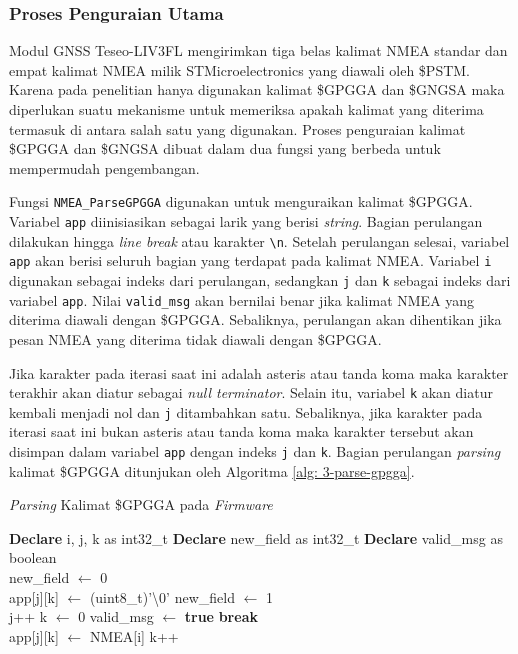 \subsubsection{Proses Penguraian Utama}
Modul GNSS Teseo\hyp{}LIV3FL mengirimkan tiga belas kalimat NMEA standar dan empat kalimat NMEA milik STMicroelectronics yang diawali oleh \$PSTM. Karena pada penelitian hanya digunakan kalimat \$GPGGA dan \$GNGSA maka diperlukan suatu mekanisme untuk memeriksa apakah kalimat yang diterima termasuk di antara salah satu yang digunakan. Proses penguraian kalimat \$GPGGA dan \$GNGSA dibuat dalam dua fungsi yang berbeda untuk mempermudah pengembangan. 

Fungsi \texttt{NMEA\_ParseGPGGA} digunakan untuk menguraikan kalimat \$GPGGA. Variabel \texttt{app} diinisiasikan sebagai larik yang berisi \textit{string}. Bagian perulangan dilakukan hingga \textit{line break} atau karakter \texttt{\textbackslash n}. Setelah perulangan selesai, variabel \texttt{app} akan berisi seluruh bagian yang terdapat pada kalimat NMEA. Variabel \texttt{i} digunakan sebagai indeks dari perulangan, sedangkan \texttt{j} dan \texttt{k} sebagai indeks dari variabel \texttt{app}. Nilai \texttt{valid\_msg} akan bernilai benar jika kalimat NMEA yang diterima diawali dengan \$GPGGA. Sebaliknya, perulangan akan dihentikan jika pesan NMEA yang diterima tidak diawali dengan \$GPGGA.

Jika karakter pada iterasi saat ini adalah asteris atau tanda koma maka karakter terakhir akan diatur sebagai \textit{null terminator}. Selain itu, variabel \texttt{k} akan diatur kembali menjadi nol dan \texttt{j} ditambahkan satu. Sebaliknya, jika karakter pada iterasi saat ini bukan asteris atau tanda koma maka karakter tersebut akan disimpan dalam variabel \texttt{app} dengan indeks \texttt{j} dan \texttt{k}. Bagian perulangan \textit{parsing} kalimat \$GPGGA ditunjukan oleh Algoritma \ref{alg: 3-parse-gpgga}.

\begin{algorithm}[H]
	\caption{\textit{Parsing} Kalimat \$GPGGA pada \textit{Firmware}}
	\label{alg: 3-parse-gpgga}
	\begin{algorithmic}[1]
	\State \textbf{Declare} i, j, k as int32\_t
	\State \textbf{Declare} new\_field as int32\_t
	\State \textbf{Declare} valid\_msg as boolean
	\\
		\State new\_field $\gets$ 0
		\\
			\State app[j][k] $\gets$ (uint8\_t)'\textbackslash 0'
			\State new\_field $\gets$ 1
			\\
				\State j++
				\State k $\gets$ 0
				\State valid\_msg $\gets$ \textbf{true}
			\Else
				\State \textbf{break}
			\EndIf
		\EndIf
		\\
			\State app[j][k] $\gets$ NMEA[i]
			\State k++
		\EndIf
	\EndFor
	\\			
	\end{algorithmic}
\end{algorithm}

